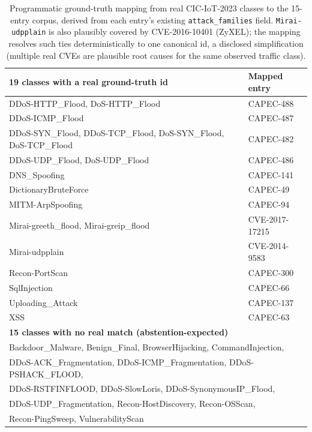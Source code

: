 \documentclass[11pt]{article}
\begin{document}
\begin{table}[h]
\centering
\small
\begin{tabular}{ll}
\toprule
\textbf{19 classes with a real ground-truth id} & \textbf{Mapped entry} \\
\midrule
DDoS-HTTP\_Flood, DoS-HTTP\_Flood & CAPEC-488 \\
DDoS-ICMP\_Flood & CAPEC-487 \\
DDoS-SYN\_Flood, DDoS-TCP\_Flood, DoS-SYN\_Flood, DoS-TCP\_Flood & CAPEC-482 \\
DDoS-UDP\_Flood, DoS-UDP\_Flood & CAPEC-486 \\
DNS\_Spoofing & CAPEC-141 \\
DictionaryBruteForce & CAPEC-49 \\
MITM-ArpSpoofing & CAPEC-94 \\
Mirai-greeth\_flood, Mirai-greip\_flood & CVE-2017-17215 \\
Mirai-udpplain & CVE-2014-9583 \\
Recon-PortScan & CAPEC-300 \\
SqlInjection & CAPEC-66 \\
Uploading\_Attack & CAPEC-137 \\
XSS & CAPEC-63 \\
\midrule
\textbf{15 classes with no real match (abstention-expected)} & \\
\midrule
\multicolumn{2}{l}{Backdoor\_Malware, Benign\_Final, BrowserHijacking, CommandInjection,} \\
\multicolumn{2}{l}{DDoS-ACK\_Fragmentation, DDoS-ICMP\_Fragmentation, DDoS-PSHACK\_FLOOD,} \\
\multicolumn{2}{l}{DDoS-RSTFINFLOOD, DDoS-SlowLoris, DDoS-SynonymousIP\_Flood,} \\
\multicolumn{2}{l}{DDoS-UDP\_Fragmentation, Recon-HostDiscovery, Recon-OSScan,} \\
\multicolumn{2}{l}{Recon-PingSweep, VulnerabilityScan} \\
\bottomrule
\end{tabular}
\caption{Programmatic ground-truth mapping from real CIC-IoT-2023 classes
to the 15-entry corpus, derived from each entry's existing
\texttt{attack\_families} field. \texttt{Mirai-udpplain} is also plausibly
covered by CVE-2016-10401 (ZyXEL); the mapping resolves such ties
deterministically to one canonical id, a disclosed simplification (multiple
real CVEs are plausible root causes for the same observed traffic class).}
\label{tab:mapping}
\end{table}
\end{document}

